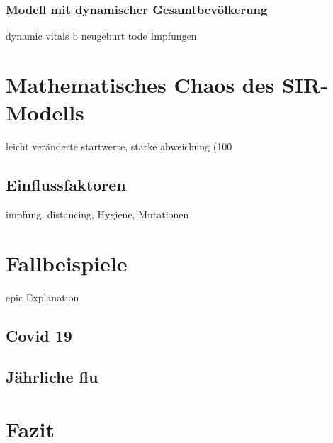 \documentclass[12pt]{scrartcl} %
\begin{document}
\subsubsection{Modell mit dynamischer Gesamtbevölkerung}
dynamic vitals
b
\textnu neugeburt
\textmu tode
\textrho Impfungen


\section{Mathematisches Chaos des SIR-Modells}

leicht veränderte startwerte, starke abweichung (100%

\newpage
\subsection{Einflussfaktoren}

impfung, distancing, Hygiene, Mutationen


\newpage
\section{Fallbeispiele}

epic Explanation


\subsection{Covid 19}

\newpage
\subsection{Jährliche flu}

\newpage
\section{Fazit}


\newpage
\setlength{\bibitemsep}{\baselineskip}
\printbibliography[heading=bibintoc]
\thispagestyle{empty}
\listoffigures
\end{document}

